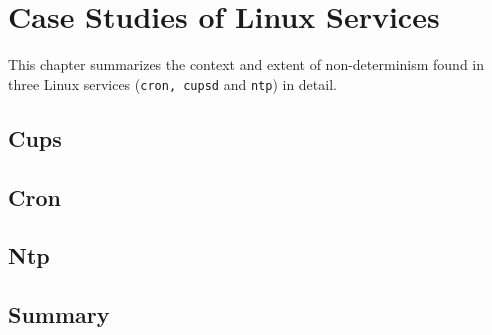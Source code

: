\chapter{Case Studies of Linux Services} 
This chapter summarizes the context and extent of non-determinism
found in three Linux services (\texttt{cron, cupsd} and \texttt{ntp}) 
in detail.

\section{Cups}
\section{Cron}
\section{Ntp}

\section {Summary}

